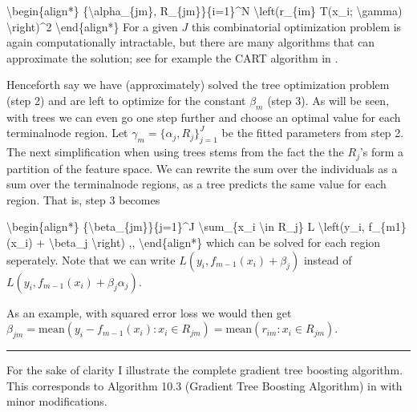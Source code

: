 \documentclass[letterpaper,10pt,english]{sphinxmanual}
\begin{document}
\textbackslash{}begin\{align*\}
\{\textbackslash{}alpha\_\{jm\}, R\_\{jm\}\}\{i=1\}\textasciicircum{}N \textbackslash{}left(r\_\{im\} \sphinxhyphen{} T(x\_i; \textbackslash{}gamma) \textbackslash{}right)\textasciicircum{}2
\textbackslash{}end\{align*\}
For a given \(J\) this combinatorial optimization problem is again computationally intractable, but there are many algorithms that can approximate the solution; see for example the CART algorithm in .

Henceforth say we have (approximately) solved the tree optimization problem (step 2) and are left to optimize for the constant \(\beta_m\) (step 3). As will be seen, with trees we can even go one step further and choose an optimal value for each terminal\sphinxhyphen{}node region. Let \(\gamma_m = \{\alpha_j, R_j\}_{j=1}^J\) be the fitted parameters from step 2. The next simplification when using trees stems from the fact the the \(R_j\)’s form a partition of the feature space. We can rewrite the sum over the individuals as a sum over the terminal\sphinxhyphen{}node regions, as a tree predicts the same value for each region. That is, step 3 becomes

\textbackslash{}begin\{align*\}
\{\textbackslash{}beta\_\{jm\}\}\{j=1\}\textasciicircum{}J \textbackslash{}sum\_\{x\_i \textbackslash{}in R\_j\} L \textbackslash{}left(y\_i, f\_\{m\sphinxhyphen{}1\}(x\_i) + \textbackslash{}beta\_j \textbackslash{}right) ,,
\textbackslash{}end\{align*\}
which can be solved for each region seperately. Note that we can write \(L \left(y_i, f_{m-1}(x_i) + \beta_j \right)\) instead of \(L \left(y_i, f_{m-1}(x_i) + \beta_j \alpha_j \right)\).

As an example, with squared error loss we would then get \(\beta_{jm} = \text{mean}(y_i - f_{m-1}(x_i) : x_i \in R_{jm}) = \text{mean}(r_{im} : x_i \in R_{jm})\).


\bigskip\hrule\bigskip



For the sake of clarity I illustrate the complete gradient tree boosting algorithm. This corresponds to Algorithm 10.3 (Gradient Tree Boosting Algorithm) in  with minor modifications.
\end{document}
